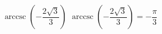  {$\operatorname{arccsc} \left( -\dfrac{2\sqrt{3}}{3} \right)$}
{ $\operatorname{arccsc} \left( -\dfrac{2\sqrt{3}}{3} \right) = -\dfrac{\pi}{3}$}
